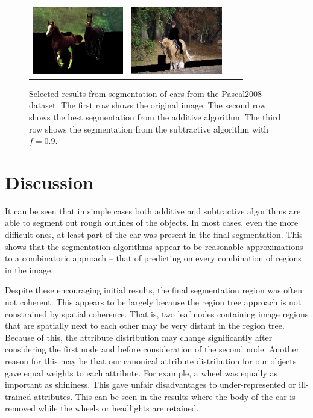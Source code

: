 \documentclass[10pt,twocolumn,letterpaper]{article}
\begin{document}
\begin{figure}[p]
\begin{tabular}{ p{4cm} p{4cm} p{4cm} p{4cm} }
\includegraphics[width=3.95cm]{figures/add_res/horse/2008_003055.jpg_3_okay.jpg.eps} &
\includegraphics[width=3.95cm]{figures/add_res/horse/2008_004470.jpg_3_bad.jpg.eps} \\
\end{tabular}
\caption{Selected results from segmentation of cars from the Pascal2008
dataset.  The first row shows the original image.  The second row shows
the best segmentation from the additive algorithm.  The third row shows
the segmentation from the subtractive algorithm with $f=0.9$.}
\label{fig:good_results_car}
\end{figure}


\section{Discussion}
\label{sec:discussion}
It can be seen that in simple cases both additive and subtractive algorithms
are able to segment out rough outlines of the objects.  In most cases, even
the more difficult ones, at least part of the car was present in the final
segmentation.  This shows that the segmentation algorithms appear to be
reasonable approximations to a combinatoric approach -- that of predicting
on every combination of regions in the image.

Despite these encouraging initial results, the final segmentation region
was often not coherent.
This appears to be largely because the region tree approach is not
constrained by spatial coherence.  That is, two leaf nodes containing image
regions that are spatially next to each other may be very distant in the
region tree.  Because of this, the attribute distribution may change significantly
after considering the first node and before consideration of the second node.
Another reason for this may be that our canonical attribute distribution for
our objects gave equal weights to each attribute.  For example, a wheel was
equally as important as shininess.  This gave unfair disadvantages to
under-represented or ill-trained attributes.  This can be seen in the results
where the body of the car is removed while the wheels or headlights are
retained.
\end{document}

